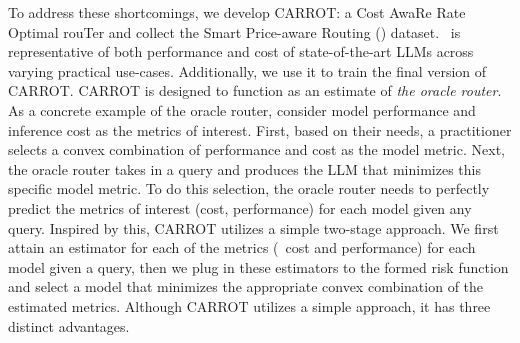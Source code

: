 


To address these shortcomings, we develop CARROT: a Cost AwaRe Rate Optimal rouTer and collect the Smart Price-aware Routing (\newdata) dataset. \newdata\ is representative of both performance and cost of state-of-the-art LLMs across varying practical use-cases. Additionally, we use it to train the final version of CARROT. CARROT is designed to function as an estimate of \emph{the oracle router}. As a concrete example of the oracle router, consider model performance and inference cost as the metrics of interest. First, based on their needs, a practitioner selects a convex combination of performance and cost as the model metric. Next, the oracle router takes in a query and produces the LLM that minimizes this specific model metric. To do this selection, the oracle router needs to perfectly predict the metrics of interest (cost, performance) for each model given any query. Inspired by this, CARROT %
utilizes a simple two-stage approach. We first attain an estimator for each of the metrics (\eg\ cost and performance) for each model given a query, then we plug in these estimators to the formed risk function and select a model that minimizes the appropriate convex combination of the estimated metrics. Although CARROT utilizes a simple approach, it has three distinct advantages.


